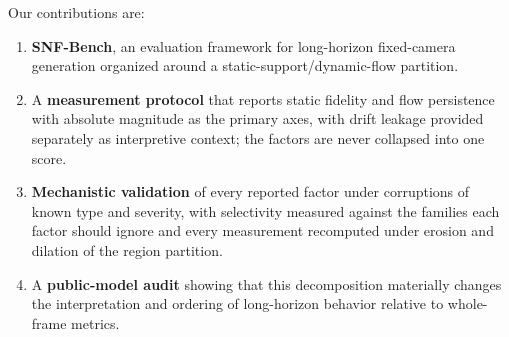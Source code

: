 Our contributions are:
\begin{enumerate}
\item \textbf{SNF-Bench}, an evaluation framework for long-horizon fixed-camera generation organized around a static-support/dynamic-flow partition.
\item A \textbf{measurement protocol} that reports static fidelity and flow persistence with absolute magnitude as the primary axes, with drift leakage provided separately as interpretive context; the factors are never collapsed into one score.
\item \textbf{Mechanistic validation} of every reported factor under corruptions of known type and severity, with selectivity measured against the families each factor should ignore and every measurement recomputed under erosion and dilation of the region partition.
\item A \textbf{public-model audit} showing that this decomposition materially changes the interpretation and ordering of long-horizon behavior relative to whole-frame metrics.
\end{enumerate}
